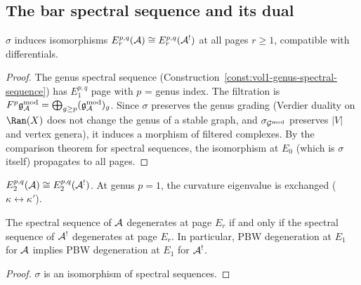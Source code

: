 %
%

\subsection{The bar spectral sequence and its dual}
\label{subsec:thqg-IV-spectral-sequence}

\begin{proposition}
\label{prop:thqg-IV-spectral-duality}
$\sigma$ induces isomorphisms
$E_r^{p,q}(\mathcal{A}) \cong E_r^{p,q}(\mathcal{A}^!)$ at all pages $r \geq 1$,
compatible with differentials.
\end{proposition}

\begin{proof}
The genus spectral sequence (Construction~\ref{const:vol1-genus-spectral-sequence})
has $E_1^{p,q}$ page with $p$ = genus index. The filtration is
$F^p \mathfrak{g}_{\mathcal{A}}^{\mathrm{mod}} = \bigoplus_{g \geq p}(\mathfrak{g}_{\mathcal{A}}^{\mathrm{mod}})_g$. Since
$\sigma$ preserves the genus grading (Verdier duality on $\Ran(X)$ does not
change the genus of a stable graph, and $\sigma_{\mathcal{G}^{\mathrm{mod}}}$ preserves
$|V|$ and vertex genera), it induces a morphism of filtered complexes.
By the comparison theorem for spectral sequences, the isomorphism at
$E_0$ (which is $\sigma$ itself) propagates to all pages.
\end{proof}

\begin{corollary}
\label{cor:thqg-IV-e2-duality}
$E_2^{p,q}(\mathcal{A}) \cong E_2^{p,q}(\mathcal{A}^!)$.
At genus $p = 1$, the curvature eigenvalue is exchanged
($\kappa \leftrightarrow \kappa'$).
\end{corollary}

\begin{corollary}
\label{cor:thqg-IV-degeneration}
The spectral sequence of $\mathcal{A}$ degenerates at page $E_r$ if and only
if the spectral sequence of $\mathcal{A}^!$ degenerates at page $E_r$.
In particular, PBW degeneration at $E_1$ for $\mathcal{A}$ implies PBW
degeneration at $E_1$ for $\mathcal{A}^!$.
\end{corollary}

\begin{proof}
$\sigma$ is an isomorphism of spectral sequences.
\end{proof}

